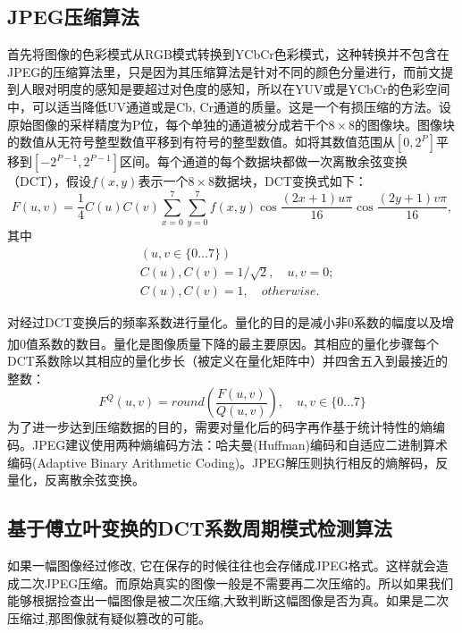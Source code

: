 \documentclass[a4paper, 10pt, notitlepage]{report}
\newcommand{\supercite}[1]{\textsuperscript{\cite{#1}}}
\begin{document}
		\subsection{JPEG压缩算法}
			首先将图像的色彩模式从RGB模式转换到YCbCr色彩模式，这种转换并不包含在JPEG的压缩算法里，只是因为其压缩算法是针对不同的颜色分量进行，而前文提到人眼对明度的感知是要超过对色度的感知，所以在YUV或是YCbCr的色彩空间中，可以适当降低UV通道或是Cb, Cr通道的质量。这是一个有损压缩的方法。设原始图像的采样精度为P位，每个单独的通道被分成若干个$8\times8$的图像块。图像块的数值从无符号整型数值平移到有符号的整型数值。如将其数值范围从$[0, 2^P]$平移到$[-2^{P-1}, 2^{P-1}]$区间。每个通道的每个数据块都做一次离散余弦变换（DCT），假设$f(x, y)$表示一个$8\times8$数据块，DCT变换式如下：
			\begin{equation}
				F(u, v) = \frac{1}{4}C(u)C(v) \sum_{x=0}^{7}\sum_{y=0}^{7} f(x, y)\cos\frac{(2x + 1)u\pi}{16}\cos\frac{(2y + 1)v\pi}{16},
			\end{equation}
			其中
			\begin{equation}
				\begin{split}
					& (u, v \in \{0\dots7\}) \\
					& C(u),C(v) = 1/\sqrt2, \quad u, v = 0; \\
					& C(u),C(v) = 1, \quad otherwise.
				\end{split}
			\end{equation}

			对经过DCT变换后的频率系数进行量化。量化的目的是减小非0系数的幅度以及增加0值系数的数目。量化是图像质量下降的最主要原因\supercite{karson1995jpeg}。其相应的量化步骤每个DCT系数除以其相应的量化步长（被定义在量化矩阵中）并四舍五入到最接近的整数：
			\begin{equation}
				F^Q(u, v) = round(\frac{F(u,v)}{Q(u,v)}), \quad u,v\in\{0\dots7\}
			\end{equation}
			为了进一步达到压缩数据的目的，需要对量化后的码字再作基于统计特性的熵编码。JPEG建议使用两种熵编码方法：哈夫曼(Huffman)编码和自适应二进制算术编码(Adaptive Binary Arithmetic Coding)。JPEG解压则执行相反的熵解码，反量化，反离散余弦变换。

		\subsection{基于傅立叶变换的DCT系数周期模式检测算法}
			如果一幅图像经过修改, 它在保存的时候往往也会存储成JPEG格式。这样就会造成二次JPEG压缩。而原始真实的图像一般是不需要再二次压缩的。所以如果我们能够根据捡查出一幅图像是被二次压缩,大致判断这幅图像是否为真。如果是二次压缩过,那图像就有疑似篡改的可能。
\end{document}
